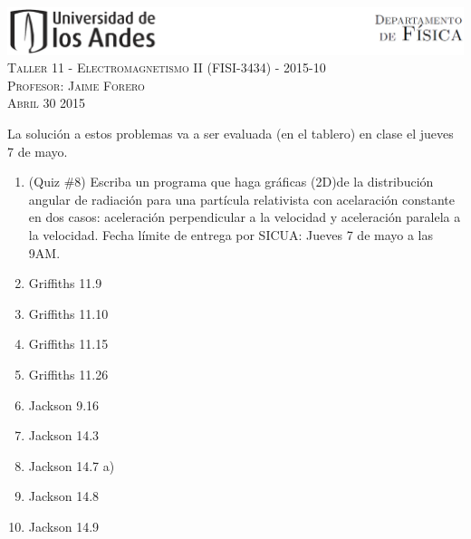 \documentclass[letterpaper,10pt,onecolumn]{article}
\begin{document}
\begin{center}

\includegraphics[width=490pt]{header.png}\\[0.5cm]

\textsc{\LARGE Taller 11 - Electromagnetismo II (FISI-3434) - 2015-10}\\[0.5cm]

\textsc{\Large{Profesor: Jaime Forero}} \\[0.5cm]

\textsc{Abril 30 2015} \\[0.5cm]

\end{center}

La soluci\'on a estos problemas va a ser evaluada (en el tablero) en
clase el jueves 7 de mayo.

\begin{enumerate}
\item (Quiz \#8) Escriba un programa que haga gr\'aficas (2D)de la
  distribuci\'on angular de radiaci\'on para una part\'icula
  relativista con acelaraci\'on constante en dos casos: aceleraci\'on
  perpendicular a la velocidad y aceleraci\'on paralela a la velocidad.
  Fecha l\'imite de entrega por SICUA: Jueves 7 de mayo a las 9AM. 

\item Griffiths 11.9

\item Griffiths 11.10

\item Griffiths 11.15

\item Griffiths 11.26

\item Jackson 9.16

\item Jackson 14.3

\item Jackson 14.7 a)

\item Jackson 14.8

\item Jackson 14.9

\end{enumerate}
\end{document}
